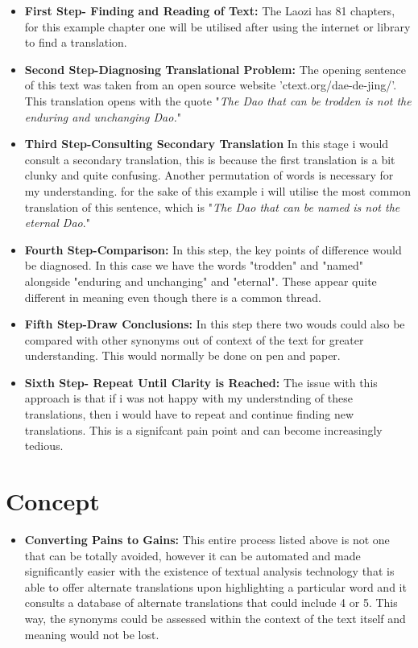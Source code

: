 \documentclass{article}
\begin{document}
\begin{itemize}

\item{\textbf{First Step- Finding and Reading of Text:} The Laozi has 81 chapters, for this example chapter one will be utilised after using the internet or library to find a translation.}
\item{\textbf{Second Step-Diagnosing Translational Problem:} The opening sentence of this text was taken from an open source website 'ctext.org/dae-de-jing/'. This translation opens with the quote "\textit{The Dao that can be trodden is not the enduring and unchanging Dao.}"}

\item{\textbf{Third Step-Consulting Secondary Translation} In this stage i would consult a secondary translation, this is because the first translation is a bit clunky and quite confusing. Another permutation of words is necessary for my understanding. for the sake of this example i will utilise the most common translation of this sentence, which is "\textit{The Dao that can be named is not the eternal Dao}."}
\item{\textbf{Fourth Step-Comparison:} In this step, the key points of difference would be diagnosed. In this case we have the words "trodden" and "named" alongside "enduring and unchanging" and "eternal". These appear quite different in meaning even though there is a common thread.}
\item{\textbf{Fifth Step-Draw Conclusions:} In this step there two wouds could also be compared with other synonyms out of context of the text for greater understanding. This would normally be done on pen and paper.}
\item{\textbf{Sixth Step- Repeat Until Clarity is Reached:} The issue with this approach is that if i was not happy with my understnding of these translations, then i would have to repeat and continue finding new translations. This is a signifcant pain point and can become increasingly tedious.}


\end{itemize}

\section{Concept}

\begin{itemize}

\item{\textbf{Converting Pains to Gains:} This entire process listed above is not one that can be totally avoided, however it can be automated and made significantly easier with the existence of textual analysis technology that is able to offer alternate translations upon highlighting a particular word and it consults a database of alternate translations that could include 4 or 5. This way, the synonyms could be assessed within the context of the text itself and meaning would not be lost.}

\end{itemize}
\end{document}
